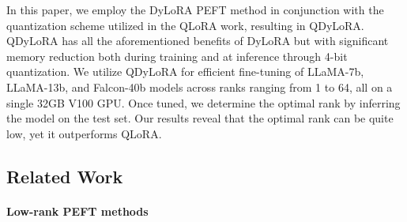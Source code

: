 \documentclass[11pt]{article}
\begin{document}
In this paper, we employ the DyLoRA PEFT method in conjunction with the quantization scheme utilized in the QLoRA work, resulting in  QDyLoRA. QDyLoRA has all the aforementioned benefits of DyLoRA but with significant memory reduction both during training and at inference through 4-bit quantization.
We utilize QDyLoRA for efficient fine-tuning of LLaMA-7b, LLaMA-13b, and Falcon-40b models across ranks ranging from 1 to 64, all on a single 32GB V100 GPU. Once tuned, we determine the optimal rank by inferring the model on the test set. Our results reveal that the optimal rank can be quite low, yet it outperforms QLoRA.



\begin{table}[htb!]
    \caption{Comparing the performance of QLoRA and QDyLoRA across different evaluation ranks. Both models receives the same training settings. Maximum LoRA rank is set to 64. Falcon-40b is adopted as the base LLM. Exact matching and Bleu-score are used as evaluation measurements for GSM8k and Web-GLM, respectively.}
    \centering
    \label{t2}
\end{table}

\subsection{Related Work}
\paragraph{Low-rank PEFT methods}
\end{document}
